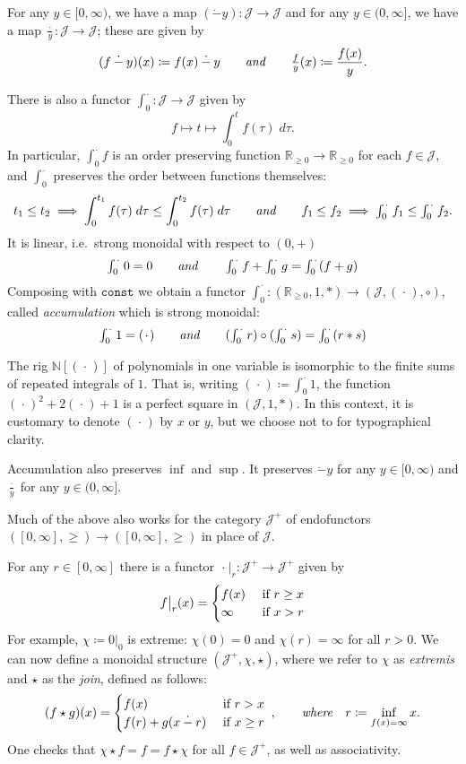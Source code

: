 \documentclass[11pt, one side, article]{memoir}
\theoremstyle{definition}
\theoremstyle{plain}
\newenvironment{remark}
  {\pushQED{\qed}\renewcommand{\qedsymbol}{$\lozenge$}\remarkx}
  {\popQED\endremarkx}
\newcommand{\cat}[1]{\mathcal{#1}}%
\newcommand{\id}{\mathrm{id}}
\newcommand{\tn}[1]{\textnormal{#1}}
\newcommand{\nn}{\mathbb{N}}
\newcommand{\rr}{\mathbb{R}}
\newcommand{\const}{\texttt{const}}
\newcommand{\blank}[1][1pt]{\hspace{#1}\cdot\hspace{#1}}
\newcommand{\rest}[2][\blank]{#1\big|_{#2}}
\newcommand{\hh}[2][]{#1 \tn{\textit{#2}} #1}
\newcommand{\qqand}{\hh[\qquad]{and}}
\newcommand{\hi}[4][]{#1 #2 \tn{\textit{#4}} #3}
\newcommand{\where}[1][,]{\hi[#1]{\qquad}{\quad}{where}}
\newcommand{\rrnon}{\rr_{\geq0}}
\newcommand{\dotminus}{\mathbin{\dot{-}}}
\renewcommand{\d}[1]{\;d #1}
\newcommand{\varint}{\textstyle\int}
\newcommand{\intzero}[1][\blank]{\varint_0^{#1}}
\newcommand{\xid}[1][\blank]{(#1)}
\begin{document}

For any $y\in[0,\infty)$, we have a map $(\dotminus y)\colon\cat{J}\to\cat{J}$ and for any $y\in(0,\infty]$, we have a map $\frac{\blank}{y}\colon\cat{J}\to\cat{J}$; these are given by
\[
	(f\dotminus y)(x)\coloneqq f(x)\dotminus y
	\qqand
	\textstyle\frac{f}{y}(x)\displaystyle\coloneqq \frac{f(x)}{y}.
\]

There is also a functor $\intzero\colon\cat{J}\to\cat{J}$ given by
\[
f\mapsto t\mapsto\int_0^t f(\tau) \d \tau.
\]
In particular, $\intzero f$ is an order preserving function $\rrnon\to\rrnon$ for each $f\in\cat{J}$, and $\intzero$ preserves the order between functions themselves:
\[
t_1\leq 
t_2
\implies 
\int_0^{t_1}f(\tau)\d\tau\leq
\int_0^{t_2}f(\tau)\d\tau
\qqand
f_1\leq 
f_2
\implies
\intzero f_1\leq
\intzero f_2.
\]
It is linear, i.e.\ strong monoidal with respect to $(0,+)$
\[
\intzero 0=0
\qqand
\intzero f+\intzero g=\intzero (f+g)
\]
Composing with $\const$ we obtain a functor $\intzero\colon(\rrnon,1,*)\to(\cat{J},\xid,\circ)$, called  \emph{accumulation} which is strong monoidal:
\[
\intzero 1=\xid
\qqand
(\intzero r)\circ(\intzero s)=\intzero(r*s)
\]

\begin{remark}
The rig $\nn[\xid]$ of polynomials in one variable is isomorphic to the finite sums of repeated integrals of $1$. That is, writing $\xid\coloneqq\intzero 1$, the function $\xid^2+2\xid+1$ is a perfect square in $(\cat{J},1,*)$. In this context, it is customary to denote $\xid$ by $x$ or $y$, but we choose not to for typographical clarity.
\end{remark}

Accumulation also preserves $\inf$ and $\sup$. It preserves $\dotminus y$ for any $y\in[0,\infty)$ and $\frac{\blank}{y}$ for any $y\in(0,\infty]$.

Much of the above also works for the category $\cat{J}^+$ of endofunctors $([0,\infty],\geq)\to([0,\infty],\geq)$ in place of $\cat{J}$. 

For any $r\in[0,\infty]$ there is a functor $\rest{r}\colon\cat{J}^+\to\cat{J}^+$ given by
\[
\rest[f]{r}(x)=
	\begin{cases}
		f(x)&\tn{ if }r\geq x\\
		\infty&\tn{ if } x>r
	\end{cases}
\]
For example, $\chi\coloneqq\rest[0]{0}$ is extreme: $\chi(0)=0$ and $\chi(r)=\infty$ for all $r>0$. 
We can now define a monoidal structure $(\cat{J}^+,\chi,\star)$, where we refer to $\chi$ as \emph{extremis} and $\star$ as the \emph{join}, defined as follows:
\[
(f\star g)(x)=
\begin{cases}
	f(x)&\tn{ if }r> x\\
	f(r)+g(x\dotminus r)&\tn{ if }x\geq r
\end{cases}
\;\where
r\coloneqq\inf_{f(x)=\infty}x.
\]
One checks that $\chi\star f=f=f\star\chi$ for all $f\in\cat{J}^+$, as well as associativity.
\end{document}
